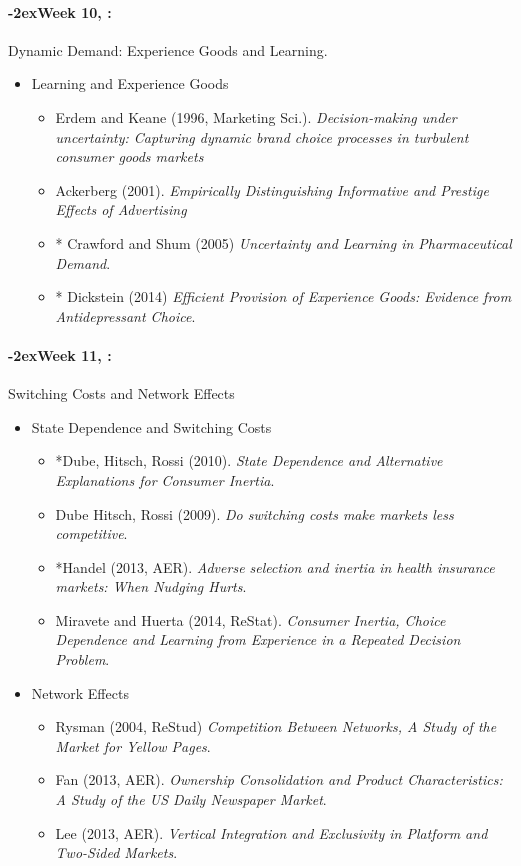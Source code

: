 \documentclass[11pt]{article}
\newcommand{\week}[1]{%
  \paragraph*{\kern-2ex\quad #1, \syldate{\today}:}%
  \ifdim\wd1=\wd\THURSDAY
    \AdvanceDate[7]
  \else
    \AdvanceDate[7]
  \fi%
}
\begin{document}
\week{Week 10} Dynamic Demand: Experience Goods and Learning.
\begin{itemize}
\item Learning and Experience Goods
\begin{itemize}
\item Erdem and Keane (1996, Marketing Sci.). \textit{Decision-making under uncertainty: Capturing dynamic brand choice processes in turbulent consumer goods markets}
\item Ackerberg (2001). \textit{Empirically Distinguishing Informative and Prestige Effects of Advertising}
\item * Crawford and Shum (2005) \textit{Uncertainty and Learning in Pharmaceutical Demand}.
\item * Dickstein (2014) \textit{Efficient Provision of Experience Goods: Evidence from Antidepressant Choice}.
\end{itemize}
\end{itemize}


\week{Week 11} Switching Costs and Network Effects
\begin{itemize}
\item State Dependence and Switching Costs
\begin{itemize}
\item *Dube, Hitsch, Rossi (2010). \textit{State Dependence and Alternative Explanations for Consumer Inertia}.
\item Dube Hitsch, Rossi (2009). \textit{Do switching costs make markets less competitive}.
\item *Handel (2013, AER). \textit{Adverse selection and inertia in health insurance markets: When Nudging Hurts}.
\item Miravete and Huerta (2014, ReStat). \textit{Consumer Inertia, Choice Dependence and Learning from Experience in a Repeated Decision Problem}.
\end{itemize}
\item Network Effects
\begin{itemize}
\item Rysman (2004, ReStud) \textit{Competition Between Networks, A Study of the Market for Yellow Pages}.
\item Fan (2013, AER). \textit{Ownership Consolidation and Product Characteristics: A Study of the US Daily Newspaper Market}.
\item Lee (2013, AER). \textit{Vertical Integration and Exclusivity in Platform and Two-Sided Markets}.
\end{itemize}
\end{itemize}
\end{document}
